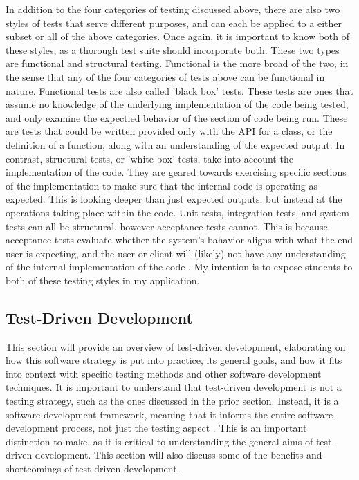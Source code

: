\documentclass[10pt,twocolumn]{article}
\begin{document}
In addition to the four categories of testing discussed above, there are also two styles of tests that serve different 
purposes, and can each be applied to a either subset or all of the above categories. Once again, it is important to know 
both of these styles, as a thorough test suite should incorporate both. These two types are functional and structural 
testing. Functional is the more broad of the two, in the sense that any of the four categories of tests above can be 
functional in nature. Functional tests are also called 'black box' tests. These tests are ones that assume no knowledge 
of the underlying implementation of the code being tested, and only examine the expectied behavior of the section of 
code being run. These are tests that could be written provided only with the API for a class, or the definition of a 
function, along with an understanding of the expected output. In contrast, structural tests, or 'white box' tests, 
take into account the implementation of the code. They are geared towards exercising specific sections of the 
implementation to make sure that the internal code is operating as expected. This is looking deeper than just expected 
outputs, but instead at the operations taking place within the code. Unit tests, integration tests, and system tests 
can all be structural, however acceptance tests cannot. This is because acceptance tests evaluate whether the system's 
bahavior aligns with what the end user is expecting, and the user or client will (likely) not have any understanding of 
the internal implementation of the code \cite{Sawant2012Article}. My intention is to expose students to both of these 
testing styles in my application.

\subsection{Test-Driven Development}

This section will provide an overview of test-driven development, elaborating on how this software strategy is put into 
practice, its general goals, and how it fits into context with specific testing methods and other software 
development techniques. It is important to understand that test-driven development is not a testing strategy, such as 
the ones discussed in the prior section. Instead, it is a software development framework, meaning
that it informs the entire software development process, not just the testing aspect \cite{George2004Article}. This is 
an important distinction to make, as it is critical to understanding the general aims of test-driven development. This 
section will also discuss some of the benefits and shortcomings of test-driven development. 
\end{document}
